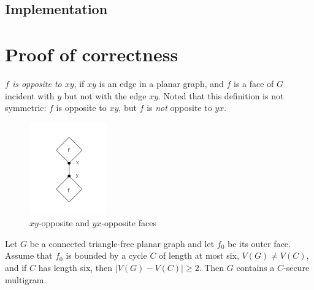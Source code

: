 \subsection{Implementation}
\section{Proof of correctness}
\begin{definition}
\textit{$f$ is opposite to $xy$}, if $xy$ is an edge in a planar graph, and $f$ is a face of $G$ incident with $y$ but not with the edge $xy$. Noted that this definition is not symmetric: $f$ is opposite to $xy$, but $f$ is \textit{not} opposite to $yx$. \cite{dvorak2013threecoloring}
\begin{figure}[H] %
\centering %
\includegraphics[width=0.3\textwidth]{figure/opposite.png} 
\caption{$xy$-opposite and $yx$-opposite faces} %
\label{figure} %
\end{figure}
\end{definition}

\begin{lemma}
Let $G$ be a connected triangle-free planar graph and let $f_0$ be its
outer face. Assume that $f_0$ is bounded by a cycle $C$ of length at most six,
$V(G) \ne V (C)$, and if $C$ has length six, then $|V(G) - V(C)| \geq 2$. Then $G$
contains a $C$-secure multigram. \cite{dvorak2013threecoloring}
\end{lemma}

